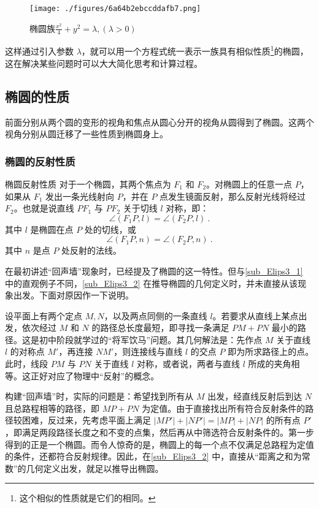 \begin{figure}[ht]
\centering
\texttt{[image: ./figures/6a64b2ebccddafb7.png]}
\caption{椭圆族$\displaystyle\frac{x^2}{4} + y^2 = \lambda,(\lambda>0)$}\label{fig_Elips3_7}
\end{figure}

这样通过引入参数 $\lambda$，就可以用一个方程式统一表示一族具有相似性质\footnote{这个相似的性质就是它们的相同。}的椭圆，这在解决某些问题时可以大大简化思考和计算过程。

\subsection{椭圆的性质}

前面分别从两个圆的变形的视角和焦点从圆心分开的视角从圆得到了椭圆。这两个视角分别从圆迁移了一些性质到椭圆身上。

\subsubsection{椭圆的反射性质}

\begin{theorem}{椭圆反射性质}
对于一个椭圆，其两个焦点为 $F_1$ 和 $F_2$。对椭圆上的任意一点 $P$，如果从 $F_1$ 发出一条光线射向 $P$，并在 $P$ 点发生镜面反射，那么反射光线将经过 $F_2$。也就是说直线 $PF_1$ 与 $PF_2$ 关于切线 $l$ 对称，即：
\begin{equation}
\angle (F_1P, l) = \angle (F_2P, l)~.
\end{equation}
其中 $l$ 是椭圆在点 $P$ 处的切线，或
\begin{equation}
\angle (F_1P, n) = \angle (F_2P, n)~.
\end{equation}
其中 $n$ 是点 $P$ 处反射的法线。
\end{theorem}

在最初讲述“回声墙”现象时，已经提及了椭圆的这一特性。但与\autoref{sub_Elips3_1} 中的直观例子不同，\autoref{sub_Elips3_2} 在推导椭圆的几何定义时，并未直接从该现象出发。下面对原因作一下说明。

设平面上有两个定点 $M,N$，以及两点同侧的一条直线 $l$。若要求从直线上某点出发，依次经过 $M$ 和 $N$ 的路径总长度最短，即寻找一条满足 $PM + PN$ 最小的路径。这是初中阶段就学过的“将军饮马”问题。其几何解法是：先作点 $M$ 关于直线 $l$ 的对称点 $M'$，再连接 $NM'$，则连接线与直线 $l$ 的交点 $P$ 即为所求路径上的点。此时，线段 $PM$ 与 $PN$ 关于直线 $l$ 对称，或者说，两者与直线 $l$ 所成的夹角相等。这正好对应了物理中“反射”的概念。

构建“回声墙”时，实际的问题是：希望找到所有从 $M$ 出发，经直线反射后到达 $N$ 且总路程相等的路径，即 $MP + PN$ 为定值。由于直接找出所有符合反射条件的路径较困难，反过来，先考虑平面上满足 $|MP'| + |NP'| = |MP| + |NP|$ 的所有点 $P'$，即满足两段路径长度之和不变的点集，然后再从中筛选符合反射条件的。第一步得到的正是一个椭圆。而令人惊奇的是，椭圆上的每一个点不仅满足总路程为定值的条件，还都符合反射规律。因此，在\autoref{sub_Elips3_2} 中，直接从“距离之和为常数”的几何定义出发，就足以推导出椭圆。

